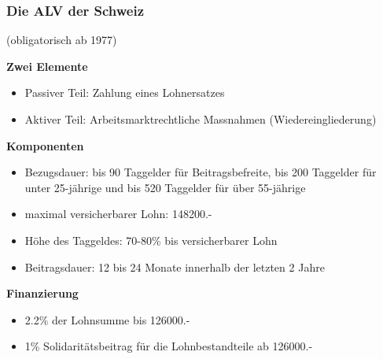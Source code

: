 \subsubsection{Die ALV der Schweiz}
(obligatorisch ab 1977)\\
\begin{description}
	\item \textbf{Zwei Elemente}
	\begin{itemize}
		\item Passiver Teil: Zahlung eines Lohnersatzes
		\item Aktiver Teil: Arbeitsmarktrechtliche Massnahmen (Wiedereingliederung)
	\end{itemize}
	\item \textbf{Komponenten}
	\begin{itemize}
		\item Bezugsdauer: bis 90 Taggelder für Beitragsbefreite, bis 200 Taggelder für unter 25-jährige und bis 520 Taggelder für über 55-jährige
		\item maximal versicherbarer Lohn: 148200.-
		\item Höhe des Taggeldes: 70-80\% bis versicherbarer Lohn
		\item Beitragsdauer: 12 bis 24 Monate innerhalb der letzten 2 Jahre
	\end{itemize}
	\item \textbf{Finanzierung}
	\begin{itemize}
		\item 2.2\% der Lohnsumme bis 126000.-
		\item 1\% Solidaritätsbeitrag für die Lohnbestandteile ab 126000.-
	\end{itemize}
\end{description}

